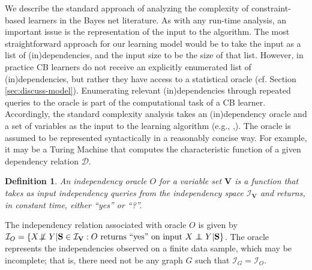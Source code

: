 \documentclass{elsarticle}%
\newtheorem{definition}[theorem]{Definition}
\DeclareMathOperator{\NP}{\mathbf{\mathrm{NP}}}
\newcommand{\indep}{\ensuremath{\perp{}\!\!\!\!\!\!\!\perp{}}}
\newcommand{\dep}{\ensuremath{{\perp{}\!\!\!\!\!\!\!\not  \perp{}}}}
\newcommand{\G}{G}
\newcommand{\fast}{\mathrm{fast}}
\newcommand{\D}{\mathcal{D}}
\newcommand{\I}{\mathcal{I}}
\begin{document}
We describe the standard approach of analyzing the complexity of constraint-based learners in the Bayes net literature. 
As with any run-time analysis, an important issue is the representation of the input to the algorithm. The most straightforward approach for our learning model would be to take the input as a list of (in)dependencies, and the input size to be the size of that list. However, in practice CB learners do not receive an explicitly enumerated list of (in)dependencies, but rather they have access to a statistical oracle (cf. Section \ref{sec:discuss-model}). Enumerating relevant (in)dependencies through repeated queries to the oracle is part of the computational task of a CB learner. Accordingly, the standard complexity analysis takes an (in)dependency oracle and a set of variables as the input to the learning algorithm (e.g., \cite[Def.12]{chickering04:_large_sampl_learn_bayes_networ_np_hard},\cite{bouckaert95:_bayes}). The oracle is assumed to be represented syntactically in a reasonably concise way. For example, it may be a Turing Machine that computes the characteristic function of a given dependency relation $\D$.  

\begin{definition}
  An independency oracle $O$ for a variable set $\mathbf{V}$
  is a function that takes as input independency queries
  from the independency space $\I_{\mathbf{V}}$ and returns, in constant time, either ``yes'' or ``?''.
\end{definition}
%
The independency relation associated with oracle $O$ is given by
$\I_O = \{X \dep Y |\mathbf{S} \in \I_{\mathbf{V}}:
O \linebreak[0]\mbox{ returns} \linebreak[0] \text{ ``yes'' on input }\linebreak[0]X \indep Y |\mathbf{S}\}$. The oracle represents the independencies observed on a finite data sample, which may be incomplete; that is, there need not be any graph $\G$ such that $\I_{\G} = \I_{O}$.

\end{document}
